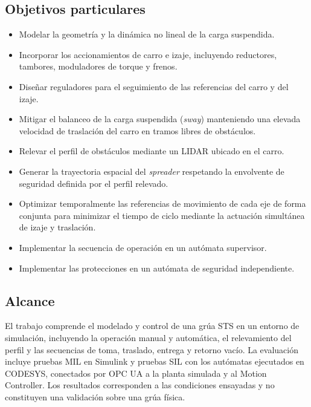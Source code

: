 \documentclass[a4paper,10pt,onecolumn,journal]{ieeeconf}
\numberwithin{equation}{section}
\begin{document}
	
	\subsection{Objetivos particulares}
	\begin{itemize}
		\item Modelar la geometría y la dinámica no lineal de la carga suspendida.
		\item Incorporar los accionamientos de carro e izaje, incluyendo reductores, tambores, moduladores de torque y frenos.
		\item Diseñar reguladores para el seguimiento de las referencias del carro y del izaje.
		\item Mitigar el balanceo de la carga suspendida (\textit{sway}) manteniendo una elevada velocidad de traslación del carro en tramos libres de obstáculos.
		\item Relevar el perfil de obstáculos mediante un LIDAR ubicado en el carro.
		\item Generar la trayectoria espacial del \textit{spreader} respetando la envolvente de seguridad definida por el perfil relevado.
		\item Optimizar temporalmente las referencias de movimiento de cada eje de forma conjunta para minimizar el tiempo de ciclo mediante la actuación simultánea de izaje y traslación.  
		\item Implementar la secuencia de operación en un autómata supervisor.
		\item Implementar las protecciones en un autómata de seguridad independiente.
	\end{itemize}
	
	
	\subsection{Alcance}

El trabajo comprende el modelado y control de una grúa STS en un entorno de simulación, incluyendo la operación manual y automática, el relevamiento del perfil y las secuencias de toma, traslado, entrega y retorno vacío. La evaluación incluye pruebas MIL en Simulink y pruebas SIL con los autómatas ejecutados en CODESYS, conectados por OPC UA a la planta simulada y al Motion Controller. Los resultados corresponden a las condiciones ensayadas y no constituyen una validación sobre una grúa física.
\par
\end{document}
